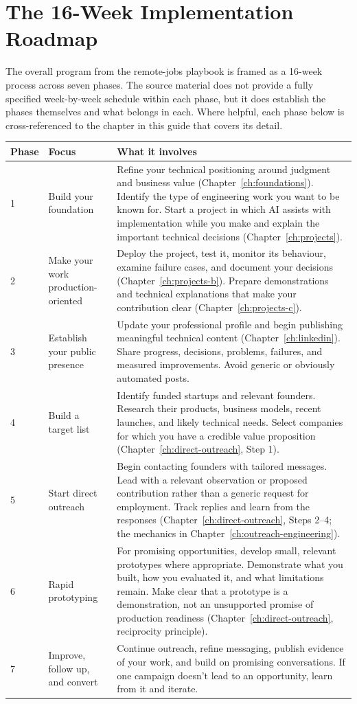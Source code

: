 \chapter{The 16-Week Implementation Roadmap}
\label{ch:roadmap}

The overall program from the remote-jobs playbook is framed as a 16-week process across seven phases. The source
material does not provide a fully specified week-by-week schedule within each phase, but it does establish the
phases themselves and what belongs in each. Where helpful, each phase below is cross-referenced to the chapter in
this guide that covers its detail.

\begin{longtable}{p{} p{} p{}}
\toprule
\textbf{Phase} & \textbf{Focus} & \textbf{What it involves} \\
\midrule
\endhead
1 & Build your foundation & Refine your technical positioning around judgment and business value
(Chapter~\ref{ch:foundations}). Identify the type of engineering work you want to be known for. Start a project
in which AI assists with implementation while you make and explain the important technical decisions
(Chapter~\ref{ch:projects}). \\
2 & Make your work production-oriented & Deploy the project, test it, monitor its behaviour, examine failure
cases, and document your decisions (Chapter~\ref{ch:projects-b}). Prepare demonstrations and technical
explanations that make your contribution clear (Chapter~\ref{ch:projects-c}). \\
3 & Establish your public presence & Update your professional profile and begin publishing meaningful technical
content (Chapter~\ref{ch:linkedin}). Share progress, decisions, problems, failures, and measured improvements.
Avoid generic or obviously automated posts. \\
4 & Build a target list & Identify funded startups and relevant founders. Research their products, business
models, recent launches, and likely technical needs. Select companies for which you have a credible value
proposition (Chapter~\ref{ch:direct-outreach}, Step 1). \\
5 & Start direct outreach & Begin contacting founders with tailored messages. Lead with a relevant observation or
proposed contribution rather than a generic request for employment. Track replies and learn from the responses
(Chapter~\ref{ch:direct-outreach}, Steps 2--4; the mechanics in Chapter~\ref{ch:outreach-engineering}). \\
6 & Rapid prototyping & For promising opportunities, develop small, relevant prototypes where appropriate.
Demonstrate what you built, how you evaluated it, and what limitations remain. Make clear that a prototype is a
demonstration, not an unsupported promise of production readiness (Chapter~\ref{ch:direct-outreach}, reciprocity
principle). \\
7 & Improve, follow up, and convert & Continue outreach, refine messaging, publish evidence of your work, and
build on promising conversations. If one campaign doesn't lead to an opportunity, learn from it and iterate. \\
\bottomrule
\end{longtable}

